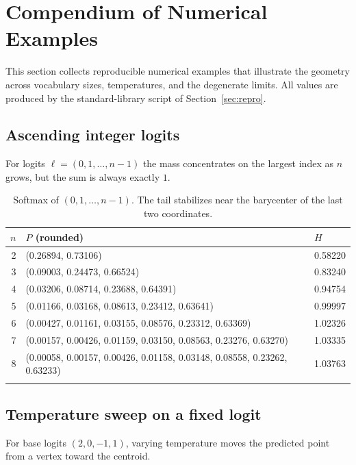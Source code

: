 \documentclass[11pt]{article}
\begin{document}
\section{Compendium of Numerical Examples}
\label{sec:compendium}

This section collects reproducible numerical examples that illustrate the
geometry across vocabulary sizes, temperatures, and the degenerate limits. All
values are produced by the standard-library script of Section~\ref{sec:repro}.

\subsection{Ascending integer logits}
\label{sec:comp-asc}

For logits $\ell=(0,1,\dots,n-1)$ the mass concentrates on the largest index as
$n$ grows, but the sum is always exactly $1$.

\begin{longtable}{@{}rll@{}}
\toprule
$n$ & $P$ (rounded) & $H$ \\
\midrule
2 & (0.26894, 0.73106) & 0.58220 \\
3 & (0.09003, 0.24473, 0.66524) & 0.83240 \\
4 & (0.03206, 0.08714, 0.23688, 0.64391) & 0.94754 \\
5 & (0.01166, 0.03168, 0.08613, 0.23412, 0.63641) & 0.99997 \\
6 & (0.00427, 0.01161, 0.03155, 0.08576, 0.23312, 0.63369) & 1.02326 \\
7 & (0.00157, 0.00426, 0.01159, 0.03150, 0.08563, 0.23276, 0.63270) & 1.03335 \\
8 & (0.00058, 0.00157, 0.00426, 0.01158, 0.03148, 0.08558, 0.23262, 0.63233) & 1.03763 \\
\bottomrule
\caption{Softmax of $(0,1,\dots,n-1)$. The tail stabilizes near the barycenter
of the last two coordinates.}
\label{tab:comp-asc}
\end{longtable}

\subsection{Temperature sweep on a fixed logit}
\label{sec:comp-temp}

For base logits $(2,0,-1,1)$, varying temperature moves the predicted point
from a vertex toward the centroid.
\end{document}

